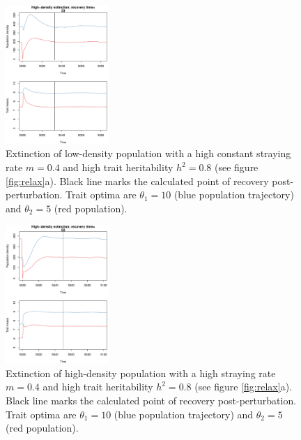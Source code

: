 \documentclass[twocolumn,preprintnumbers,amsmath,amssymb,superscriptaddress]{revtex4}
\begin{document}
\begin{figure}
  \captionsetup{justification=raggedright,
singlelinecheck=false
}
\centering
\includegraphics[width=0.35\textwidth]{figs2/fig_relax_small_highh.pdf}
\caption{
Extinction of low-density population with a high constant straying rate $m=0.4$ and high trait heritability $h^2=0.8$ (see figure \ref{fig:relax}a).
Black line marks the calculated point of recovery post-perturbation.
Trait optima are $\theta_1 = 10$ (blue population trajectory) and $\theta_2 = 5$ (red population).
} \label{fig:relaxtraj_ldhh}
\end{figure}

\begin{figure}
  \captionsetup{justification=raggedright,
singlelinecheck=false
}
\centering
\includegraphics[width=0.35\textwidth]{figs2/fig_relax_large_highh.pdf}
\caption{
Extinction of high-density population with a high straying rate $m=0.4$ and high trait heritability $h^2=0.8$ (see figure \ref{fig:relax}a).
Black line marks the calculated point of recovery post-perturbation.
Trait optima are $\theta_1 = 10$ (blue population trajectory) and $\theta_2 = 5$ (red population).
} \label{fig:relaxtraj_hdhh}
\end{figure}
\end{document}
